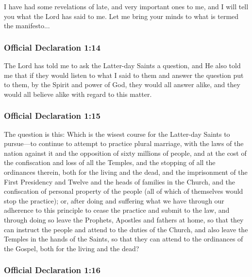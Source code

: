 		I have had some revelations of late, and very important ones to me, and I will tell you what the Lord has said to me.  Let me bring your minds to what is termed the manifesto...
		
	\subsubsection{Official Declaration 1:14} %
		\label{OD1-14}
		
		The Lord has told me to ask the Latter-day Saints a question, and He also told me that if they would listen to what I said to them and answer the question put to them, by the Spirit and power of God, they would all answer alike, and they would all believe alike with regard to this matter.
		
	\subsubsection{Official Declaration 1:15} %
		\label{OD1-15}
		
		The question is this: Which is the wisest course for the Latter-day Saints to pursue—to continue to attempt to practice plural marriage, with the laws of the nation against it and the opposition of sixty millions of people, and at the cost of the confiscation and loss of all the Temples, and the stopping of all the ordinances therein, both for the living and the dead, and the imprisonment of the First Presidency and Twelve and the heads of families in the Church, and the confiscation of personal property of the people (all of which of themselves would stop the practice); or, after doing and suffering what we have through our adherence to this principle to cease the practice and submit to the law, and through doing so leave the Prophets, Apostles and fathers at home, so that they can instruct the people and attend to the duties of the Church, and also leave the Temples in the hands of the Saints, so that they can attend to the ordinances of the Gospel, both for the living and the dead?
		
	\subsubsection{Official Declaration 1:16} %
		\label{OD1-16}
		
